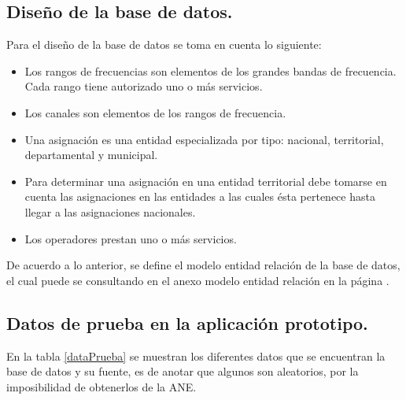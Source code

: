 \subsection{Diseño de la base de datos.}

Para el diseño de la base de datos se toma en cuenta lo siguiente:

\begin{itemize}
	\item Los rangos de frecuencias son elementos de los grandes bandas de frecuencia. Cada rango tiene autorizado uno o más servicios.
	\item Los canales son elementos de los rangos de frecuencia.
	\item Una asignación es una entidad especializada por tipo: nacional, territorial, departamental y municipal.
	\item Para determinar una asignación en una entidad territorial debe tomarse en cuenta las asignaciones en las entidades a las cuales ésta pertenece hasta llegar a las asignaciones nacionales.
	\item Los operadores prestan uno o más servicios.
\end{itemize}

De acuerdo a lo anterior, se define el modelo entidad relación de la base de datos, el cual puede se consultando en el anexo modelo entidad relación en la página \pageref{modER}.

\subsection{Datos de prueba en la aplicación prototipo.}

En la tabla \ref{dataPrueba} se muestran los diferentes datos que se encuentran la base de datos y su fuente, es de anotar que algunos son aleatorios, por la imposibilidad de obtenerlos de la ANE.

